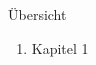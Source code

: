 \documentclass[../defence.tex]{subfiles}
\begin{document}
  \begin{frame}{Übersicht}
      \begin{enumerate}
        \item Kapitel 1
      \end{enumerate}
  \end{frame}
\end{document}
